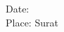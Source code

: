 \begin{flushleft}
    Date: \ExamDate{}\\
    Place: Surat
\end{flushleft}




    




    
    



    


